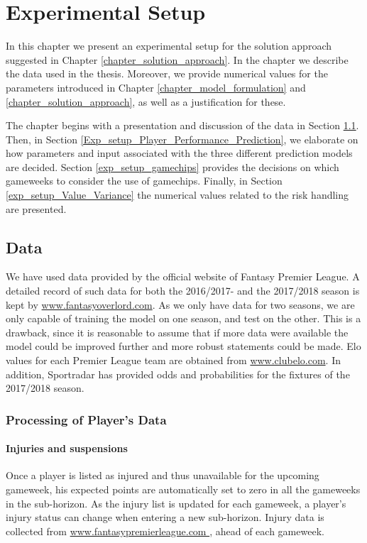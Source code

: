 \chapter{Experimental Setup}\label{chapter_experimental_setup}

In this chapter we present an experimental setup for the solution approach suggested in Chapter \ref{chapter_solution_approach}. In the chapter we describe the data used in the thesis. Moreover, we provide numerical values for the parameters introduced in Chapter \ref{chapter_model_formulation} and \ref{chapter_solution_approach}, as well as a justification for these. 

\newpar

The chapter begins with a presentation and discussion of the data in Section \ref{exp_setup_data}. Then, in Section \ref{Exp_setup_Player_Performance_Prediction}, we elaborate on how parameters and input associated with the three different prediction models are decided. Section \ref{exp_setup_gamechips} provides the decisions on which gameweeks to consider the use of gamechips. Finally, in Section \ref{exp_setup_Value_Variance} the numerical values related to the risk handling are presented.

\section{Data} \label{exp_setup_data}
We have used data provided by the official website of Fantasy Premier League. A detailed record of such data for both the 2016/2017- and the 2017/2018 season is kept by \url{www.fantasyoverlord.com}. As we only have data for two seasons, we are only capable of training the model on one season, and test on the other. This is a drawback, since it is reasonable to assume that if more data were available the model could be improved further and more robust statements could be made. Elo values for each Premier League team are obtained from \url{www.clubelo.com}. In addition, Sportradar has provided odds and probabilities for the fixtures of the 2017/2018 season. 

\subsection{Processing of Player's Data}

\subsubsection{Injuries and suspensions}
Once a player is listed as injured and thus unavailable for the upcoming gameweek, his expected points are automatically set to zero in all the gameweeks in the sub-horizon. As the injury list is updated for each gameweek, a player's injury status can change when entering a new sub-horizon. Injury data is collected from \url{www.fantasypremierleague.com }, ahead of each gameweek. 

